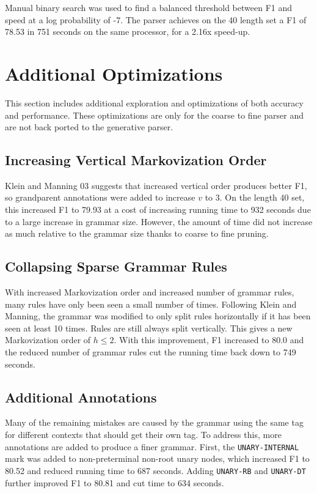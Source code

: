 \documentclass[11pt]{article}
\begin{document}
Manual binary search was used to find a balanced threshold between F1 and speed at a log
probability of -7.
The parser achieves on the 40 length set a F1 of 78.53 in 751 seconds on the same processor,
for a 2.16x speed-up.

\section{Additional Optimizations}
This section includes additional exploration and optimizations of both accuracy and performance.
These optimizations are only for the coarse to fine parser and are not back ported to the
generative parser.

\subsection{Increasing Vertical Markovization Order}
Klein and Manning 03 suggests that increased vertical order produces better F1, so grandparent
annotations were added to increase $v$ to 3. On the length 40 set, this increased F1 to 79.93
at a cost of increasing running time to 932 seconds due to a large increase in grammar size.
However, the amount of time did not increase as much relative to the grammar size thanks to
coarse to fine pruning.

\subsection{Collapsing Sparse Grammar Rules}
With increased Markovization order and increased number of grammar rules, many rules have only been
seen a small number of times. Following Klein and Manning, the grammar was modified to only split
rules horizontally if it has been seen at least 10 times. Rules are still always split vertically.
This gives a new Markovization order of $h\leq 2$. With this improvement, F1 increased to 80.0
and the reduced number of grammar rules cut the running time back down to 749 seconds.

\subsection{Additional Annotations}
Many of the remaining mistakes are caused by the grammar using the same tag for different contexts
that should get their own tag. To address this, more annotations are added to produce a finer grammar.
First, the \texttt{UNARY-INTERNAL} mark was added to non-preterminal non-root unary nodes,
which increased F1 to 80.52 and reduced running time to 687 seconds. Adding \texttt{UNARY-RB} and
\texttt{UNARY-DT} further improved F1 to 80.81 and cut time to 634 seconds.
\end{document}
